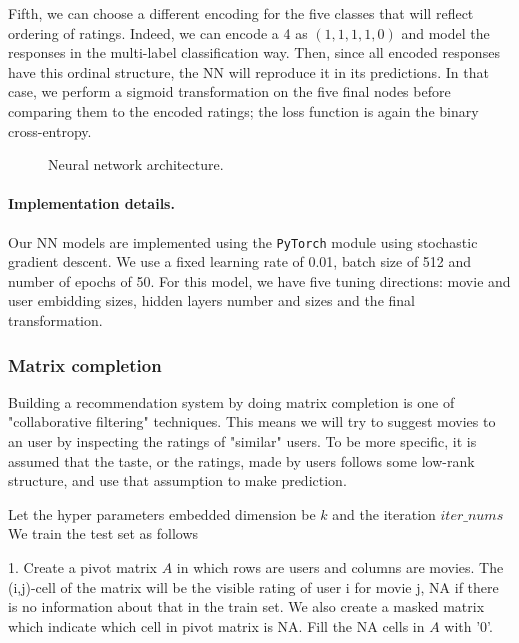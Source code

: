 \documentclass[bj, preprint]{imsart}
\begin{document}
Fifth, we can choose a different encoding for the five classes that will reflect ordering of ratings. Indeed, we can encode a 4 as $(1,1,1,1,0)$ and model the responses in the multi-label classification way. Then, since all encoded responses have this ordinal structure, the NN will reproduce it in its predictions. In that case, we perform a sigmoid transformation on the five final nodes before comparing them to the encoded ratings; the loss function is again the binary cross-entropy.




\begin{figure}

\caption{Neural network architecture.\label{fig:method.models.nn}}
\end{figure}

\paragraph{Implementation details.}\label{par:method.models.nn.impl}

Our NN models are implemented using the \texttt{PyTorch} module \citep{paszke2017automatic} using stochastic gradient descent. We use a fixed learning rate of \num{0.01}, batch size of \num{512} and number of epochs of \num{50}. For this model, we have five tuning directions: movie and user embidding sizes, hidden layers number and sizes and the final transformation.

\subsubsection{Matrix completion}\label{subsubsec:method.models.svd}
Building a recommendation system by doing matrix completion is one of "collaborative filtering" techniques. This means we will try to suggest movies to an user by inspecting the ratings of "similar" users. To be more specific, it is assumed that the taste, or the ratings, made by users follows some low-rank structure, and use that assumption to make prediction. 

Let the hyper parameters embedded dimension be $k$ and the iteration $iter\_nums$ We train the test set as follows

1. Create a pivot matrix $A$ in which rows are users and columns are movies. The (i,j)-cell of the matrix will be the visible rating of user i for movie j, NA if there is no information about that in the train set. We also create a masked matrix which indicate which cell in pivot matrix is NA. Fill the NA cells in $A$ with '0'.
\end{document}
